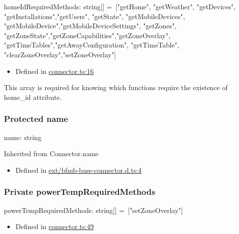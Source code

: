 \documentclass[]{article}
\providecommand{\tightlist}{%
  \setlength{\itemsep}{0pt}\setlength{\parskip}{0pt}}
\begin{document}
homeIdRequiredMethods{:} {string}{{[}{]}}{ =~{[}"getHome", "getWeather",
"getDevices", "getInstallations","getUsers", "getState",
"getMobileDevices", "getMobileDevice","getMobileDeviceSettings",
"getZones", "getZoneState","getZoneCapabilities","getZoneOverlay",
"getTimeTables","getAwayConfiguration", "getTimeTable",
"clearZoneOverlay","setZoneOverlay"{]}}

\begin{itemize}
\tightlist
\item
  Defined in
  \href{https://github.com/BFMBFramework/TadoConnector/blob/f05932b/src/connector.ts\#L16}{connector.ts:16}
\end{itemize}

This array is required for knowing which functions require the existence
of home\_id attribute.

\protect\hypertarget{name}{}{}

\hypertarget{protected-name}{%
\subsubsection{\texorpdfstring{{Protected}
name}{Protected name}}\label{protected-name}}

name{:} {string}

Inherited from Connector.name

\begin{itemize}
\tightlist
\item
  Defined in
  \href{https://github.com/BFMBFramework/TadoConnector/blob/f05932b/src/ext/bfmb-base-connector.d.ts\#L4}{ext/bfmb-base-connector.d.ts:4}
\end{itemize}

\protect\hypertarget{powertemprequiredmethods}{}{}

\hypertarget{private-powertemprequiredmethods}{%
\subsubsection{\texorpdfstring{{Private}
powerTempRequiredMethods}{Private powerTempRequiredMethods}}\label{private-powertemprequiredmethods}}

powerTempRequiredMethods{:} {string}{{[}{]}}{ =~{[}"setZoneOverlay"{]}}

\begin{itemize}
\tightlist
\item
  Defined in
  \href{https://github.com/BFMBFramework/TadoConnector/blob/f05932b/src/connector.ts\#L49}{connector.ts:49}
\end{itemize}
\end{document}
